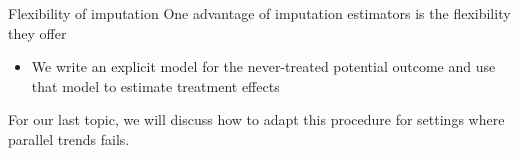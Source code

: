 \documentclass[aspectratio=169,t,11pt,table]{beamer}
\begin{document}
\begin{frame}{Flexibility of imputation}
  One advantage of imputation estimators is the flexibility they offer
  \begin{itemize}
    \item We write an explicit model for the never-treated potential outcome and use that model to estimate treatment effects
  \end{itemize}
  
  \bigskip
  For our last topic, we will discuss how to adapt this procedure for settings where parallel trends fails.
\end{frame}



\end{document}
